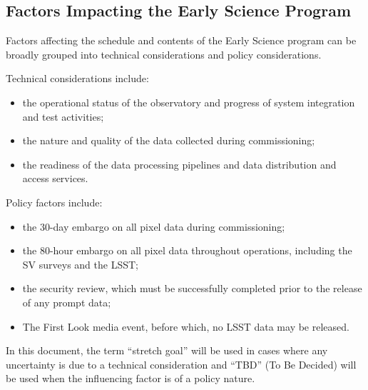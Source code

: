 \subsection{Factors Impacting the Early Science Program }
\label{ssec:impact}

Factors affecting the schedule and contents of the Early Science program can be broadly grouped into technical considerations and policy considerations. 

Technical considerations include:
\begin{itemize}
\item the operational status of the observatory and progress of system integration and test activities; 
\item the nature and quality of the data collected during commissioning; 
\item the readiness of the data processing pipelines and data distribution and access services. 
\end{itemize}
Policy factors include:
\begin{itemize}
\item the 30-day embargo on all pixel data during commissioning;
\item the 80-hour embargo on all pixel data throughout operations, including the SV surveys and the LSST; 
\item the security review, which must be successfully completed prior to the release of any prompt data; 
\item The First Look media event, before which, no LSST data may be released.
\end{itemize}
 
In this document, the term ``stretch goal'' will be used in cases where any uncertainty is due to a technical consideration and ``TBD'' (To Be Decided) will be used when the influencing factor is of a policy nature. 


